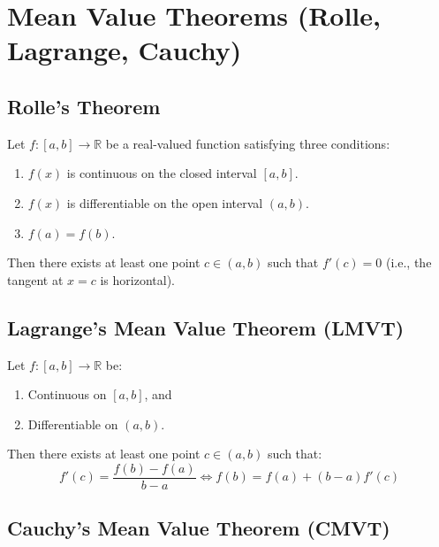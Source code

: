 \section{Mean Value Theorems (Rolle, Lagrange, Cauchy)}

\subsection{Rolle's Theorem}

\begin{theorem}
Let $f: [a,b] \to \mathbb{R}$ be a real-valued function satisfying three conditions:
\begin{enumerate}[leftmargin=1.5em]
    \item $f(x)$ is continuous on the closed interval ${[a,b]}$.
    \item $f(x)$ is differentiable on the open interval $(a,b)$.
    \item $f(a) = f(b)$.
\end{enumerate}
Then there exists at least one point $c \in (a,b)$ such that $f'(c) = 0$ (i.e., the tangent at $x=c$ is horizontal).
\end{theorem}

\subsection{Lagrange's Mean Value Theorem (LMVT)}

\begin{theorem}
Let $f: [a,b] \to \mathbb{R}$ be:
\begin{enumerate}[leftmargin=1.5em]
    \item Continuous on ${[a,b]}$, and
    \item Differentiable on $(a,b)$.
\end{enumerate}
Then there exists at least one point $c \in (a,b)$ such that:
\begin{equation}
    f'(c) = \frac{f(b) - f(a)}{b - a} \iff f(b) = f(a) + (b-a)f'(c)
\end{equation}
\end{theorem}

\subsection{Cauchy's Mean Value Theorem (CMVT)}

